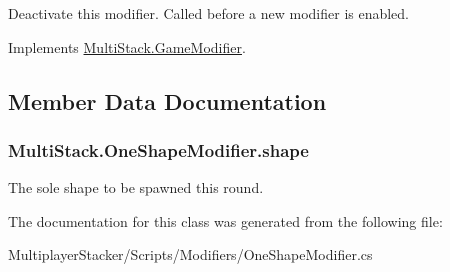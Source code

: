 Deactivate this modifier. Called before a new modifier is enabled. 



Implements \hyperlink{class_multi_stack_1_1_game_modifier_abe04db6ab31f5e5063739d8e5a3f7ad1}{Multi\+Stack.\+Game\+Modifier}.



\subsection{Member Data Documentation}
\hypertarget{class_multi_stack_1_1_one_shape_modifier_a5724e9f0dc3edb5f97363252a67b5db5}{}
\subsubsection[{shape}]{ Multi\+Stack.\+One\+Shape\+Modifier.\+shape}\label{class_multi_stack_1_1_one_shape_modifier_a5724e9f0dc3edb5f97363252a67b5db5}


The sole shape to be spawned this round. 



The documentation for this class was generated from the following file\+:\begin{DoxyCompactItemize}
\item 
Multiplayer\+Stacker/\+Scripts/\+Modifiers/One\+Shape\+Modifier.\+cs\end{DoxyCompactItemize}
